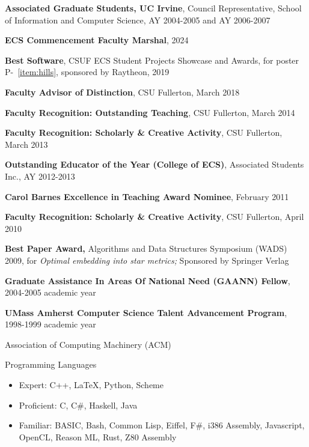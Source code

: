 \documentclass[11pt]{letter}
\begin{document}

\textbf{Associated Graduate Students, UC Irvine},  Council Representative, School of Information and Computer Science, AY 2004-2005 and AY 2006-2007 


\textbf{ECS Commencement Faculty Marshal}, 2024

\textbf{Best Software}, CSUF ECS Student Projects Showcase and Awards, for
  poster P-~\ref{item:hills}, sponsored by Raytheon, 2019

\textbf{Faculty Advisor of Distinction}, CSU Fullerton, March 2018

\textbf{Faculty Recognition: Outstanding Teaching}, CSU Fullerton, March 2014

\textbf{Faculty Recognition: Scholarly \& Creative Activity}, CSU Fullerton, March 2013

\textbf{Outstanding Educator of the Year (College of ECS)}, Associated Students Inc., AY 2012-2013

\textbf{Carol Barnes Excellence in Teaching Award Nominee}, February 2011

\textbf{Faculty Recognition: Scholarly \& Creative Activity}, CSU Fullerton, April 2010

\textbf{Best Paper Award,} Algorithms and Data Structures Symposium (WADS) 2009, for \emph{Optimal embedding into star metrics;} Sponsored by Springer Verlag

\textbf{Graduate Assistance In Areas Of National Need (GAANN) Fellow}, 2004-2005 academic year

\textbf{UMass Amherst Computer Science Talent Advancement Program}, 1998-1999 academic year


Association of Computing Machinery (ACM) \\


Programming Languages
\begin{itemize}
\item Expert: C++, LaTeX, Python, Scheme
\item Proficient: C, C\#, Haskell, Java
\item Familiar: BASIC, Bash, Common Lisp, Eiffel, F\#, i386 Assembly, Javascript,
  OpenCL, Reason ML, Rust, Z80 Assembly
\end{itemize}
\end{document}
